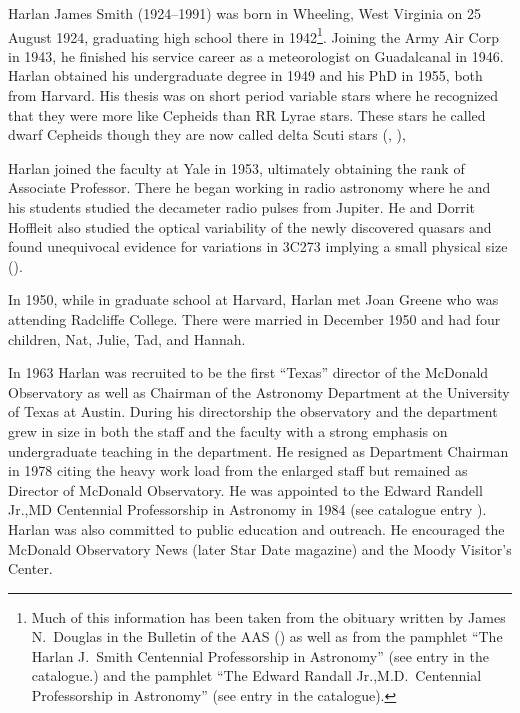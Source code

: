
Harlan James Smith (1924--1991) was born in Wheeling, West Virginia on
25 August 1924, graduating high school there in 1942\footnote{Much of
this information has been taken from the obituary written by James
N.~Douglas in the Bulletin of the AAS (\cite{Douglas1992Harlan}) as
well as from the pamphlet ``The Harlan J.~Smith Centennial
Professorship in Astronomy'' (see entry  in the
catalogue.) and the pamphlet ``The Edward Randall Jr.,M.D.~Centennial
Professorship in Astronomy'' (see entry  in the
catalogue).}. Joining the Army Air Corp in 1943, he finished his
service career as a meteorologist on Guadalcanal in 1946.  Harlan
obtained his undergraduate degree in 1949 and his PhD in 1955, both
from Harvard. His thesis was on short period variable stars where he
recognized that they were more like Cepheids than RR Lyrae stars.
These stars he called dwarf Cepheids though they are now called delta
Scuti stars (\cite{HJS1955}, \cite{HJSPhD}),

Harlan joined the faculty at Yale in 1953, ultimately obtaining the rank of
Associate Professor. There he began working in radio astronomy where
he and his students studied the decameter radio pulses from
Jupiter. He and Dorrit Hoffleit also studied the optical variability of
the newly discovered quasars and found unequivocal evidence for
variations in 3C273 implying a small physical size
(\cite{HJS1963}).

In 1950, while in graduate school at Harvard, Harlan met Joan Greene
who was attending Radcliffe College. There were married in December
1950 and had four children, Nat, Julie, Tad, and Hannah.

In 1963 Harlan was recruited to be the first ``Texas'' director of the
McDonald Observatory as well as Chairman of the Astronomy Department
at the University of Texas at Austin. During his directorship the
observatory and the department grew in size in both the staff and the
faculty with a strong emphasis on undergraduate teaching in the
department. He resigned as Department Chairman in 1978 citing the heavy
work load from the enlarged staff but remained as Director of McDonald
Observatory. He was appointed to the Edward Randell Jr.,MD Centennial
Professorship in Astronomy in 1984 (see catalogue
entry ).  Harlan was also committed to public
education and outreach.  He encouraged the McDonald Observatory News
(later Star Date magazine) and the Moody Visitor's Center.

